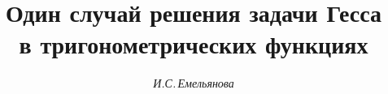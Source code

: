 









\newcommand{\ctg}{\operatorname{ctg}}


\newcommand{\tts}[1]{}










\setcounter{page}{10}












\author{\it И.С.\,Емельянова}




\title{Один случай решения задачи Гесса\\


в тригонометрических функциях}










\pagestyle{plain} %













\maketitle


